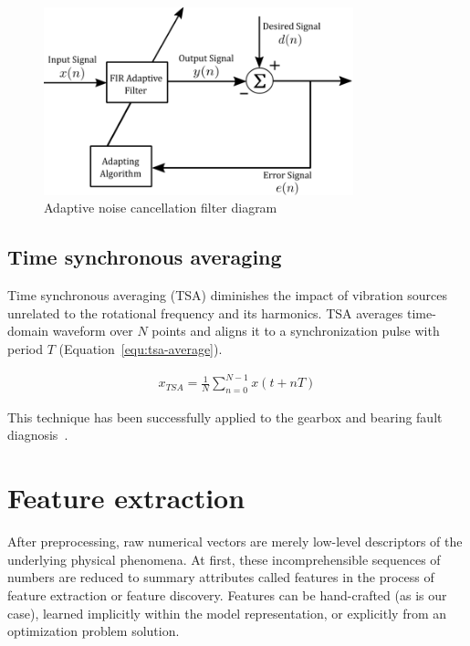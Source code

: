 \begin{figure}[h]
	\centering
	\includegraphics[width=0.8\textwidth]{assets/analysis/adaptive-filter.png}
	\caption{Adaptive noise cancellation filter diagram}
	\label{fig:adaptive-filter}
\end{figure}
\bigbreak

\subsection{Time synchronous averaging}
Time synchronous averaging (TSA) diminishes the impact of vibration sources unrelated to the rotational frequency and its harmonics. TSA averages time-domain waveform over $N$ points and aligns it to a synchronization pulse with period $T$ (Equation~\ref{equ:tsa-average}). 

\begin{ceqn}\begin{align}
x_{TSA} = \frac{1}{N} \sum_{n = 0}^{N - 1}{x(t + nT)}
\label{equ:tsa-average}
\end{align}\end{ceqn} 

This technique has been successfully applied to the gearbox and bearing fault diagnosis~\cite{davies_handbook_2012,nandi_condition_2019}.

\section{Feature extraction} \label{section:feature-extraction}
After preprocessing, raw numerical vectors are merely low-level descriptors of the underlying physical phenomena. At first, these incomprehensible sequences of numbers are reduced to summary attributes called features in the process of feature extraction or feature discovery. Features can be hand-crafted (as is our case), learned implicitly within the model representation, or explicitly from an optimization problem solution. 

